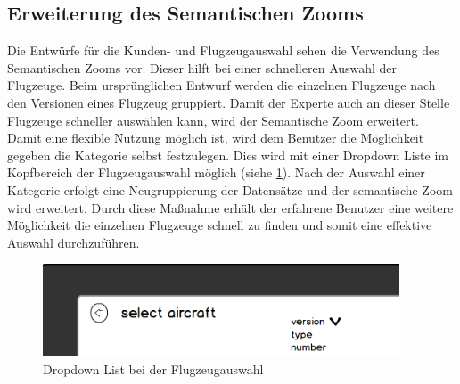 \subsection{Erweiterung des Semantischen Zooms}
Die Entwürfe für die Kunden- und Flugzeugauswahl sehen die Verwendung des Semantischen Zooms vor. Dieser hilft bei einer schnelleren Auswahl der Flugzeuge. Beim ursprünglichen Entwurf werden die einzelnen Flugzeuge nach den Versionen eines Flugzeug gruppiert. Damit der Experte auch an dieser Stelle Flugzeuge schneller auswählen kann, wird der Semantische Zoom erweitert. Damit eine flexible Nutzung möglich ist, wird dem Benutzer die Möglichkeit gegeben die Kategorie selbst festzulegen. Dies wird mit einer Dropdown Liste im Kopfbereich der Flugzeugauswahl möglich (siehe \ref{dropdown}). Nach der Auswahl einer Kategorie erfolgt eine Neugruppierung der Datensätze und der semantische Zoom wird erweitert. Durch diese Maßnahme erhält der erfahrene Benutzer eine weitere Möglichkeit die einzelnen Flugzeuge schnell zu finden und somit eine effektive Auswahl durchzuführen.
\begin{figure}
\centering
\includegraphics[width=400px]{images/semanticZoom}
\caption{Dropdown List bei der Flugzeugauswahl}
\label{dropdown}
\end{figure}
